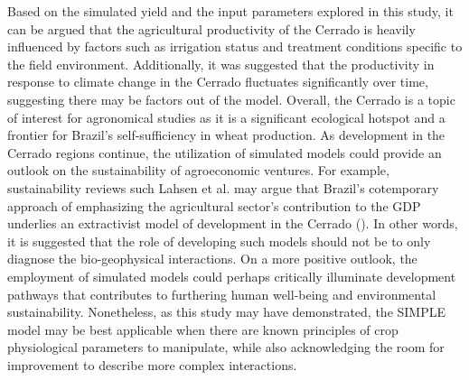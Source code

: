 \documentclass[11pt]{article}
\begin{document}
Based on the simulated yield and the input parameters explored in this study, it can be argued that the agricultural productivity of the Cerrado is heavily influenced by factors such as irrigation status and treatment conditions specific to the field environment. Additionally, it was suggested that the productivity in response to climate change in the Cerrado fluctuates significantly over time, suggesting there may be factors out of the model. Overall, the Cerrado is a topic of interest for agronomical studies as it is a significant ecological hotspot and a frontier for Brazil’s self-sufficiency in wheat production. As development in the Cerrado regions continue, the utilization of simulated models could provide an outlook on the sustainability of agroeconomic ventures.  For example, sustainability reviews such Lahsen et al. may argue that Brazil’s cotemporary approach of emphasizing the agricultural sector’s contribution to the GDP underlies an extractivist model of development in the Cerrado (\cite{lahsen-2016-under-overex}). In other words, it is suggested that the role of developing such models should not be to only diagnose the bio-geophysical interactions. On a more positive outlook, the employment of simulated models could perhaps critically illuminate development pathways that contributes to furthering human well-being and environmental sustainability. Nonetheless, as this study may have demonstrated, the SIMPLE model may be best applicable when there are known principles of crop physiological parameters to manipulate, while also acknowledging the room for improvement to describe more complex interactions.



\printbibliography
\end{document}
